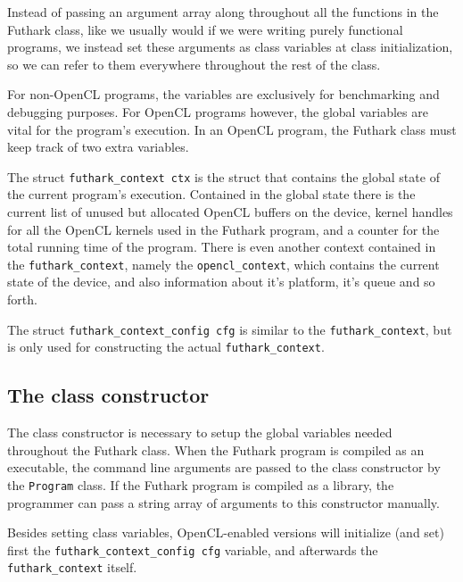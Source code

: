 Instead of passing an argument array along throughout all the functions in the
Futhark class, like we usually would if we were writing purely functional
programs, we instead set these arguments as class variables at class
initialization, so we can refer to them everywhere throughout the rest of the class.

For non-OpenCL programs, the variables are exclusively for benchmarking and
debugging purposes. For OpenCL programs however, the global variables are vital
for the program's execution.
In an OpenCL program, the Futhark class must keep track of two extra
variables.

The struct \texttt{futhark\_context ctx} is the struct that contains the global
state of the current program's execution. Contained in the global state there is
the current list of unused but allocated OpenCL buffers on the device, kernel
handles for all the OpenCL kernels used in the Futhark program, and a counter
for the total running time of the program.
There is even another context contained in the \texttt{futhark\_context}, namely
the \texttt{opencl\_context}, which contains the current state of the device,
and also information about it's platform, it's queue and so forth.

The struct \texttt{futhark\_context\_config cfg} is similar to the
\texttt{futhark\_context}, but is only used for constructing the actual
\texttt{futhark\_context}.

\subsection*{The class constructor}
The class constructor is necessary to setup the global variables needed
throughout the Futhark class. When the Futhark program is compiled as an
executable, the command line arguments are passed to the class constructor by
the \texttt{Program} class. If the Futhark program is compiled as a library, the
programmer can pass a string array of arguments to this constructor manually.

Besides setting class variables, OpenCL-enabled versions will initialize (and
set) first the \texttt{futhark\_context\_config cfg} variable, and afterwards
the \texttt{futhark\_context} itself.

